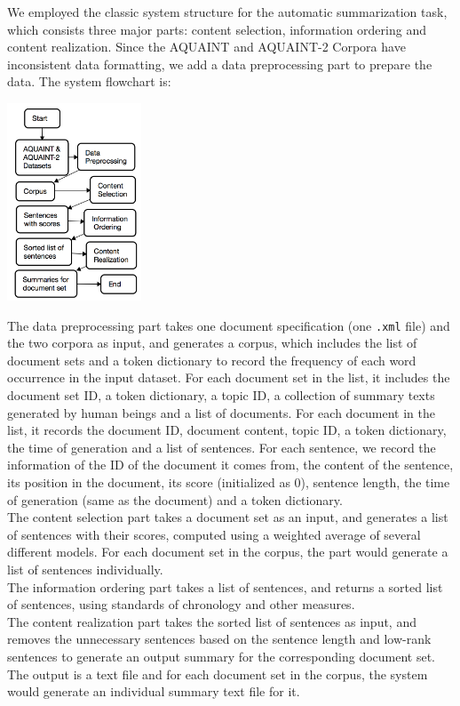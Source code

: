 \documentclass[11pt]{article}
\begin{document}
We employed the classic system structure for the automatic summarization task, which consists three major parts: content selection, information ordering and content realization. Since the AQUAINT and AQUAINT-2 Corpora have inconsistent data formatting, we add a data preprocessing part to prepare the data. The system flowchart is: \\
\begin{center}
\includegraphics[width=0.3\textwidth]{flowchart.png}
\end{center}
\indent
The data preprocessing part takes one document specification (one \texttt{.xml} file) and the two corpora as input, and generates a corpus, which includes the list of document sets and a token dictionary to record the frequency of each word occurrence in the input dataset. For each document set in the list, it includes the document set ID, a token dictionary, a topic ID, a collection of summary texts generated by human beings and a list of documents. For each document in the list, it records the document ID, document content, topic ID, a token dictionary, the time of generation and a list of sentences. For each sentence, we record the information of the ID of the document it comes from, the content of the sentence, its position in the document, its score (initialized as 0), sentence length, the time of generation (same as the document) and a token dictionary.\\
\indent
The content selection part takes a document set as an input, and generates a list of sentences with their scores, computed using a weighted average of several different models. For each document set in the corpus, the part would generate a list of sentences individually.\\
\indent
The information ordering part takes a list of sentences, and returns a sorted list of sentences, using standards of chronology and other measures. \\
\indent
The content realization part takes the sorted list of sentences as input, and removes the unnecessary sentences based on the sentence length and low-rank sentences to generate an output summary for the corresponding document set. The output is a text file and for each document set in the corpus, the system would generate an individual summary text file for it.
\end{document}

